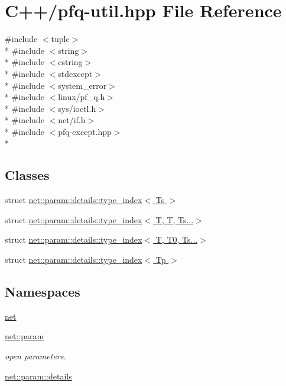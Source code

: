 \hypertarget{pfq-util_8hpp}{\section{C++/pfq-\/util.hpp File Reference}
\label{pfq-util_8hpp}
}
{\ttfamily \#include $<$tuple$>$}\\*
{\ttfamily \#include $<$string$>$}\\*
{\ttfamily \#include $<$cstring$>$}\\*
{\ttfamily \#include $<$stdexcept$>$}\\*
{\ttfamily \#include $<$system\+\_\+error$>$}\\*
{\ttfamily \#include $<$linux/pf\+\_\+q.\+h$>$}\\*
{\ttfamily \#include $<$sys/ioctl.\+h$>$}\\*
{\ttfamily \#include $<$net/if.\+h$>$}\\*
{\ttfamily \#include $<$pfq-\/except.\+hpp$>$}\\*
\subsection*{Classes}
\begin{DoxyCompactItemize}
\item 
struct \hyperlink{structnet_1_1param_1_1details_1_1type__index}{net\+::param\+::details\+::type\+\_\+index$<$ Ts $>$}
\item 
struct \hyperlink{structnet_1_1param_1_1details_1_1type__index_3_01T_00_01T_00_01Ts_8_8_8_4}{net\+::param\+::details\+::type\+\_\+index$<$ T, T, Ts...$>$}
\item 
struct \hyperlink{structnet_1_1param_1_1details_1_1type__index_3_01T_00_01T0_00_01Ts_8_8_8_4}{net\+::param\+::details\+::type\+\_\+index$<$ T, T0, Ts...$>$}
\item 
struct \hyperlink{structnet_1_1param_1_1details_1_1type__index_3_01Tp_01_4}{net\+::param\+::details\+::type\+\_\+index$<$ Tp $>$}
\end{DoxyCompactItemize}
\subsection*{Namespaces}
\begin{DoxyCompactItemize}
\item 
 \hyperlink{namespacenet}{net}
\item 
 \hyperlink{namespacenet_1_1param}{net\+::param}
\begin{DoxyCompactList}\small\item\em open parameters. \end{DoxyCompactList}\item 
 \hyperlink{namespacenet_1_1param_1_1details}{net\+::param\+::details}
\end{DoxyCompactItemize}

